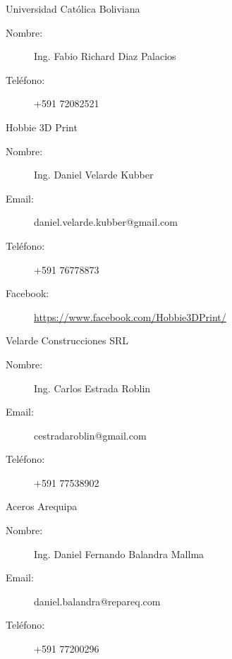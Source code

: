 \documentclass[a4paper,10pt]{article}
\begin{document}
\begin{thebibliography}{}
 Universidad Católica Boliviana
  \begin{description}
    \item[Nombre:] Ing. Fabio Richard Diaz Palacios
    \item[Teléfono:] +591 72082521
  \end{description}


 Hobbie 3D Print
  \begin{description}
    \item[Nombre:] Ing. Daniel Velarde Kubber
    \item[Email:] daniel.velarde.kubber@gmail.com
    \item[Teléfono:] +591 76778873
    \item[Facebook:] \url{https://www.facebook.com/Hobbie3DPrint/}
  \end{description}

 Velarde Construcciones SRL
  \begin{description}
    \item[Nombre:] Ing. Carlos Estrada Roblin
    \item[Email:] cestradaroblin@gmail.com
    \item[Teléfono:] +591 77538902
  \end{description}

 Aceros Arequipa
  \begin{description}
    \item[Nombre:] Ing. Daniel Fernando Balandra Mallma
    \item[Email:] daniel.balandra@repareq.com
    \item[Teléfono:] +591 77200296
  \end{description}

\end{thebibliography}
\end{document}
